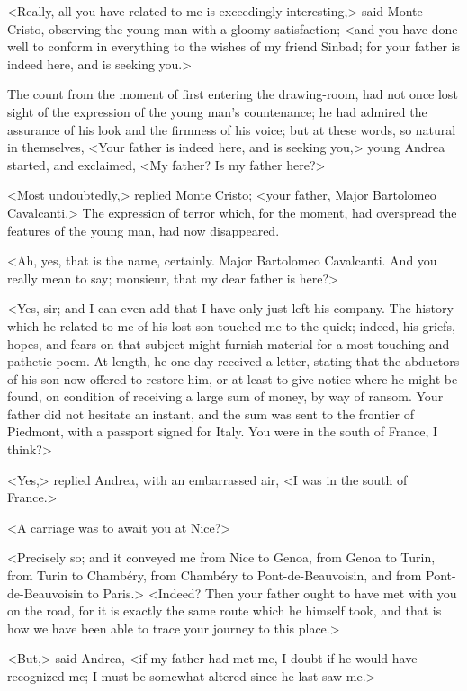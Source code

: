  <Really, all you have related to me is exceedingly interesting,> said Monte Cristo, observing the young man with a gloomy satisfaction; <and you have done well to conform in everything to the wishes of my friend Sinbad; for your father is indeed here, and is seeking you.> 

 The count from the moment of first entering the drawing-room, had not once lost sight of the expression of the young man's countenance; he had admired the assurance of his look and the firmness of his voice; but at these words, so natural in themselves, <Your father is indeed here, and is seeking you,> young Andrea started, and exclaimed, <My father? Is my father here?> 

 <Most undoubtedly,> replied Monte Cristo; <your father, Major Bartolomeo Cavalcanti.> The expression of terror which, for the moment, had overspread the features of the young man, had now disappeared. 

 <Ah, yes, that is the name, certainly. Major Bartolomeo Cavalcanti. And you really mean to say; monsieur, that my dear father is here?> 

 <Yes, sir; and I can even add that I have only just left his company. The history which he related to me of his lost son touched me to the quick; indeed, his griefs, hopes, and fears on that subject might furnish material for a most touching and pathetic poem. At length, he one day received a letter, stating that the abductors of his son now offered to restore him, or at least to give notice where he might be found, on condition of receiving a large sum of money, by way of ransom. Your father did not hesitate an instant, and the sum was sent to the frontier of Piedmont, with a passport signed for Italy. You were in the south of France, I think?> 

 <Yes,> replied Andrea, with an embarrassed air, <I was in the south of France.> 

 <A carriage was to await you at Nice?> 

 <Precisely so; and it conveyed me from Nice to Genoa, from Genoa to Turin, from Turin to Chambéry, from Chambéry to Pont-de-Beauvoisin, and from Pont-de-Beauvoisin to Paris.>  <Indeed? Then your father ought to have met with you on the road, for it is exactly the same route which he himself took, and that is how we have been able to trace your journey to this place.> 

 <But,> said Andrea, <if my father had met me, I doubt if he would have recognized me; I must be somewhat altered since he last saw me.> 

